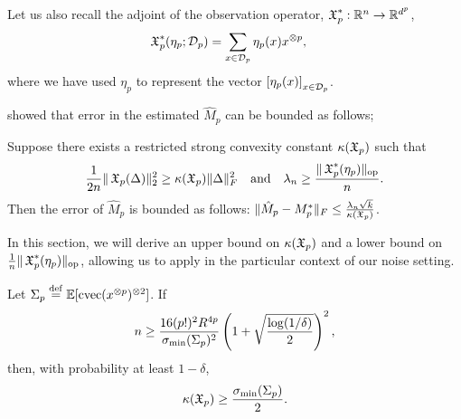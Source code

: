 Let us also recall the adjoint of the observation operator, $\operatorname{\mathfrak{X}}_p^* : \mathbb{R}^{n} \to \mathbb{R}^{d^p}$,
\begin{align*}
  \operatorname{\mathfrak{X}}_p^*(\eta_p; \mathcal{D}_p) &= \sum_{x \in \mathcal{D}_p} \eta_p(x) x^{\otimes p},
\end{align*}
where we have used $\eta_p$ to represent the vector $\left[\eta_p(x)\right]_{x \in \mathcal{D}_p}$. 

\citet{Tomioka2011} showed that error in the estimated $\hat M_p$ can be
bounded as follows;

\begin{lemma}
\label{lem:app:lowRank}
Suppose there exists a restricted strong convexity constant $\kappa(\operatorname{\mathfrak{X}}_p)$ such that
$$\frac{1}{2n} \| \operatorname{\mathfrak{X}}_p( \Delta )\|_2^2 \ge \kappa(\operatorname{\mathfrak{X}}_p) \|\Delta\|^2_F \quad \text{and} \quad
\lambda_n \ge \frac{\|\operatorname{\mathfrak{X}}_p^*(\eta_p)\|_{\text{\rm op}}}{n}.$$
Then the error of $\hat M_p$ is bounded as follows:
$\| \hat M_p - M_p^* \|_F \le \frac{\lambda_n \sqrt{k}}{\kappa(\operatorname{\mathfrak{X}}_p)}$.
\end{lemma}


In this section, we will derive an upper bound on $\kappa(\operatorname{\mathfrak{X}}_p)$ and
a lower bound on $\frac{1}{n} \| \operatorname{\mathfrak{X}}_p^*(\eta_p) \|_{\text{\rm op}}$, allowing us to apply  in the particular context of our noise setting.

\begin{lemma}
\label{lem:app:lowRankLower}
Let $\Sigma_p \stackrel{\rm def}{=} \operatorname{\mathbb{E}}[\operatorname{cvec}(x^{\otimes p})^{\otimes 2}]$.
If $$n \ge \frac{16 (p!)^2 R^{4p}}{\sigma_\text{\rm min}(\Sigma_p)^2} \left(1 + \sqrt{\frac{\log(1/\delta)}{2}}\right)^2,$$
then, with probability at least $1-\delta$,
$$\kappa(\operatorname{\mathfrak{X}}_p) \ge \frac{\sigma_\text{\rm min}(\Sigma_p)}{2}.$$
\end{lemma}

